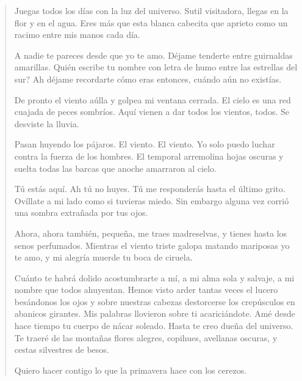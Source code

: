 \documentclass[12pt]{article}
\begin{document}
\clearpage
{}
\begin{verse}
Juegas todos los días con la luz del universo.  
Sutil visitadora, llegas en la flor y en el agua.  
Eres más que esta blanca cabecita que aprieto  
como un racimo entre mis manos cada día.  
  
A nadie te pareces desde que yo te amo.  
Déjame tenderte entre guirnaldas amarillas.  
Quién escribe tu nombre con letra de humo entre las estrellas del sur?  
Ah déjame recordarte cómo eras entonces, cuándo aún no existías.  
  
De pronto el viento aúlla y golpea mi ventana cerrada.  
El cielo es una red cuajada de peces sombríos.  
Aquí vienen a dar todos los vientos, todos.  
Se desviste la lluvia.  
  
Pasan huyendo los pájaros.  
El viento. El viento.  
Yo solo puedo luchar contra la fuerza de los hombres.  
El temporal arremolina hojas oscuras  
y suelta todas las barcas que anoche amarraron al cielo.  
  
Tú estás aquí. Ah tú no huyes.  
Tú me responderás hasta el último grito.  
Ovíllate a mi lado como si tuvieras miedo.  
Sin embargo alguna vez corrió una sombra extrañada por tus ojos.  
  
Ahora, ahora también, pequeña, me traes madreselvas,  
y tienes hasta los senos perfumados.  
Mientras el viento triste galopa matando mariposas  
yo te amo, y mi alegría muerde tu boca de ciruela.  
  
Cuánto te habrá dolido acostumbrarte a mí,  
a mi alma sola y salvaje, a mi nombre que todos ahuyentan.  
Hemos visto arder tantas veces el lucero besándonos los ojos  
y sobre nuestras cabezas destorcerse los crepúsculos en abanicos girantes.  
Mis palabras llovieron sobre ti acariciándote.  
Amé desde hace tiempo tu cuerpo de nácar soleado.  
Hasta te creo dueña del universo.  
Te traeré de las montañas flores alegres, copihues,  
avellanas oscuras, y cestas silvestres de besos.  
  
Quiero hacer contigo  
lo que la primavera hace con los cerezos.

\end{verse}
\end{document}
